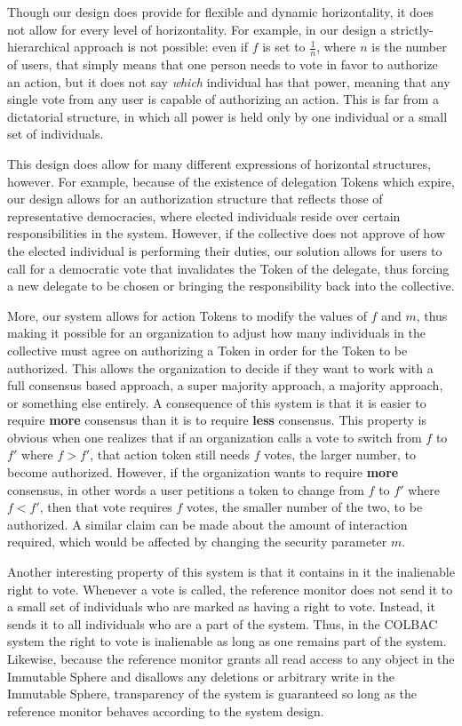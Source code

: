Though our design does provide for flexible and dynamic horizontality, it does
not allow for every level of horizontality. For example, in our design a
strictly-hierarchical approach is not possible: even if $f$ is set to
$\frac{1}{n}$, where $n$ is the number of users, that simply means that one
person needs to vote in favor to authorize an action, but it does not say
\textit{which} individual has that power, meaning that any single vote from any
user is capable of authorizing an action. This is far from a dictatorial
structure, in which all power is held only by one individual or a small set of
individuals.

This design does allow for many different expressions of horizontal structures,
however. For example, because of the existence of delegation Tokens which expire,
our design allows for an authorization structure that reflects those of
representative democracies, where elected individuals reside over certain
responsibilities in the system. However, if the collective does not approve of
how the elected individual is performing their duties, our solution allows for
users to call for a democratic vote that invalidates the Token of the delegate,
thus forcing a new delegate to be chosen or bringing the responsibility back
into the collective.

More, our system allows for action Tokens to modify the values of $f$ and $m$,
thus making it possible for an organization to adjust how many individuals in
the collective must agree on authorizing a Token in order for the Token to be
authorized. This allows the organization to decide if they want to work with
a full consensus based approach, a super majority approach, a majority approach,
or something else entirely. A consequence of this system is that it is easier to
require \textbf{more} consensus than it is to require \textbf{less} consensus.
This property is obvious when one realizes that if an organization calls a vote
to switch from $f$ to $f'$ where $f > f'$, that action token still needs $f$
votes, the larger number, to become authorized. However, if the organization
wants to require \textbf{more} consensus, in other words a user petitions a
token to change from $f$ to $f'$ where $f < f'$, then that vote requires $f$
votes, the smaller number of the two, to be authorized. A similar claim can be
made about the amount of interaction required, which would be affected by
changing the security parameter $m$.

Another interesting property of this system is that it contains in it the
inalienable right to vote. Whenever a vote is called, the reference monitor does
not send it to a small set of individuals who are marked as having a right to
vote. Instead, it sends it to all individuals who are a part of the system.
Thus, in the COLBAC system the right to vote is inalienable as long as one
remains part of the system. Likewise, because the reference monitor grants all
read access to any object in the Immutable Sphere and disallows any deletions or
arbitrary write in the Immutable Sphere, transparency of the system is
guaranteed so long as the reference monitor behaves according to the system
design.

